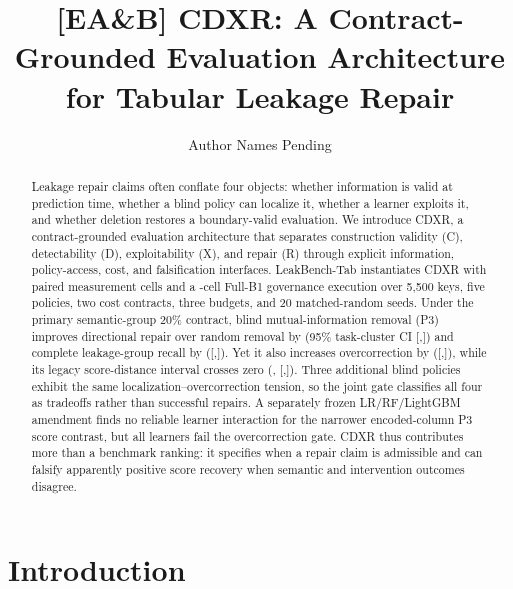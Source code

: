 \documentclass[sigconf,review]{acmart}
\title{[EA\&B] CDXR: A Contract-Grounded Evaluation Architecture for Tabular Leakage Repair}
\author{Author Names Pending}
\affiliation{%
  \institution{Affiliations Pending}
  \city{City Pending}
  \country{Country Pending}}
\begin{document}
\setlength{\emergencystretch}{1.25em}
\raggedbottom

\begin{abstract}
Leakage repair claims often conflate four objects: whether information is
valid at prediction time, whether a blind policy can localize it, whether a
learner exploits it, and whether deletion restores a boundary-valid
evaluation. We introduce CDXR, a contract-grounded evaluation architecture
that separates construction validity (C), detectability (D), exploitability
(X), and repair (R) through explicit information, policy-access, cost, and
falsification interfaces. LeakBench-Tab instantiates CDXR with \CoreCellCount{}
paired measurement cells and a \FullBOneCellCount{}-cell Full-B1 governance
execution over 5,500 keys, five policies, two cost contracts, three budgets,
and 20 matched-random seeds. Under the primary semantic-group 20\% contract,
blind mutual-information removal (P3) improves directional repair over random
removal by \PrimaryDirection{} (95\% task-cluster CI
[\PrimaryDirectionLow{},\PrimaryDirectionHigh{}]) and complete leakage-group
recall by \PrimaryGroupRecall{}
([\PrimaryGroupRecallLow{},\PrimaryGroupRecallHigh{}]). Yet it also increases
overcorrection by \PrimaryOvercorrection{}
([\PrimaryOvercorrectionLow{},\PrimaryOvercorrectionHigh{}]), while its legacy
score-distance interval crosses zero (\PrimarySdr{},
[\PrimarySdrLow{},\PrimarySdrHigh{}]). Three additional blind policies exhibit
the same localization--overcorrection tension, so the joint gate classifies all
four as tradeoffs rather than successful repairs. A separately frozen
LR/RF/LightGBM amendment finds no reliable learner interaction for the narrower
encoded-column P3 score contrast, but all learners fail the overcorrection
gate. CDXR thus contributes more than a benchmark ranking: it specifies when a
repair claim is admissible and can falsify apparently positive score recovery
when semantic and intervention outcomes disagree.
\end{abstract}


\maketitle

\section{Introduction}
\end{document}
